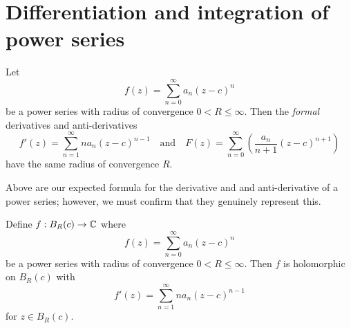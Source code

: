 \section{Differentiation and integration of power series}

\begin{proposition}[]
    Let
    \[ f(z) = \sum_{n = 0}^\infty a_n (z - c)^n \]
    be a power series with radius of convergence $0 < R \leq \infty$. 
    Then the \emph{formal} derivatives and anti-derivatives
    \[ 
        f'(z) = \sum_{n = 1}^\infty na_n(z - c)^{n - 1} 
        \quad \text{and} \quad 
        F(z) = \sum_{n = 0}^\infty \left(\frac{a_n}{n + 1} (z - c)^{n + 1}\right)
    \]
    have the same radius of convergence $R$.
\end{proposition}

Above are our expected formula for the derivative and and anti-derivative of a power series; 
however, we must confirm that they genuinely represent this. 

\begin{theorem}[]
    \label{the:power-series-derivative}
    Define $f: B_R(c) \to \mathbb{C}$ where
    \[ f(z) = \sum_{n = 0}^\infty a_n (z - c)^n \]
    be a power series with radius of convergence $0 < R \leq \infty$.
    Then $f$ is holomorphic on $B_R(c)$ with
    \[ f'(z) = \sum_{n = 1}^\infty na_n(z - c)^{n - 1} \]
    for $z \in B_R(c)$.
\end{theorem}

